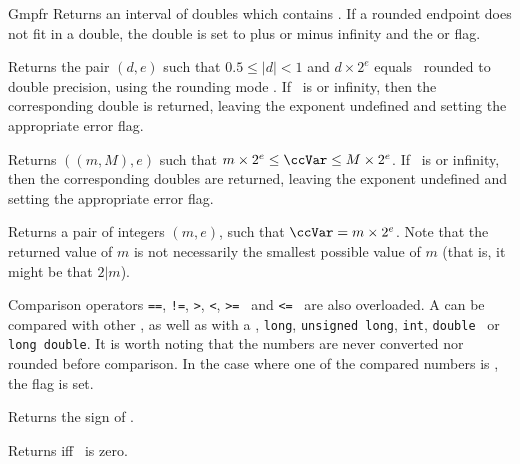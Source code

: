 \begin{ccRefClass} {Gmpfr}
        {Returns an interval of doubles which contains \ccVar. If a
        rounded endpoint does not fit in a double, the double is set to plus
        or minus infinity and the  or  flag.}

        {Returns the pair \( (d,e) \) such that \( 0.5 \le |d| < 1 \) and
        \( d \times 2^e \) equals \ccVar~rounded to double precision,
        using the rounding mode . If \ccVar~is  or
        infinity, then the corresponding double is returned, leaving
        the exponent undefined and setting the appropriate error flag.}

        {Returns \( ((m,M),e) \) such that \( m \times 2^e \le \ccVar
        \le M \times 2^e \). If \ccVar~is  or infinity, then
        the corresponding doubles are returned, leaving the exponent
        undefined and setting the appropriate error flag.}

        {Returns a pair of integers \( (m,e) \), such that
        \( \ccVar = m \times 2^e \). Note that the returned value of \(m\)
        is not necessarily the smallest possible value of \(m\) (that is,
        it might be that \(2|m\)).}



Comparison operators \verb-==-, \verb-!=-, \verb->-, \verb-<-,
\verb->=- \ and \verb-<=- \ are also overloaded. A  can
be compared with other , as well as with a ,
\verb=long=, \verb=unsigned long=, \verb=int=, \verb=double= \ or
\verb=long double=. It is worth noting that the numbers are never
converted nor rounded before comparison. In the case where one of
the compared numbers is , the  flag is set.


\ccQueryFunctions

        {Returns the sign of \ccVar.}

        {Returns  iff \ccVar~is zero.}


\end{ccRefClass}
